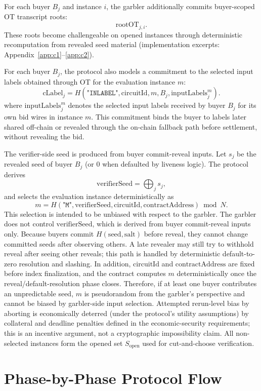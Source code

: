 \documentclass[final,twoside]{vutinfth}
\begin{document}
For each buyer $B_j$ and instance $i$, the garbler additionally commits
buyer-scoped OT transcript roots:
\[
\mathrm{rootOT}_{j,i}.
\]
These roots become challengeable on opened instances through deterministic
recomputation from revealed seed material (implementation excerpts:
Appendix~\ref{app:c1}--\ref{app:c2}).

For each buyer $B_j$, the protocol also models a commitment to the selected
input labels obtained through OT for the evaluation instance $m$:
\[
\mathrm{cLabel}_j = H(\texttt{"INLABEL"},\mathrm{circuitId},m,B_j,\mathrm{inputLabels}^m_j).
\]
where $\mathrm{inputLabels}^m_j$ denotes the selected input labels received by
buyer $B_j$ for its own bid wires in instance $m$.
This commitment binds the buyer to labels later shared off-chain or revealed
through the on-chain fallback path before settlement, without revealing the bid.

The verifier-side seed is produced from buyer commit-reveal inputs. Let
$s_j$ be the revealed seed of buyer $B_j$ (or $0$ when defaulted by liveness
logic). The protocol derives
\[
\mathrm{verifierSeed}=\bigoplus_j s_j,
\]
and selects the evaluation instance deterministically as
\[
m = H(\texttt{"M"},\mathrm{verifierSeed},\mathrm{circuitId},\mathrm{contractAddress}) \bmod N.
\]
This selection is intended to be unbiased with respect to the garbler. The
garbler does not control $\mathrm{verifierSeed}$, which is derived from
buyer commit-reveal inputs only. Because buyers commit
$H(\mathrm{seed},\mathrm{salt})$ before reveal, they cannot change committed
seeds after observing others. A late revealer may still try to withhold reveal
after seeing other reveals; this path is handled by deterministic
default-to-zero resolution and slashing. In addition, $\mathrm{circuitId}$ and
$\mathrm{contractAddress}$ are fixed before index finalization, and the
contract computes $m$ deterministically once the reveal/default-resolution
phase closes. Therefore, if at least one buyer contributes an unpredictable
seed, $m$ is pseudorandom from the garbler's perspective and cannot be biased
by garbler-side input selection. Attempted rerun-level bias by aborting is
economically deterred (under the protocol's utility assumptions) by collateral
and deadline penalties defined in the economic-security requirements; this is
an incentive argument, not a cryptographic impossibility claim.
All non-selected instances form the opened set $S_{\mathrm{open}}$ used for
cut-and-choose verification.

\section{Phase-by-Phase Protocol Flow}
\end{document}
